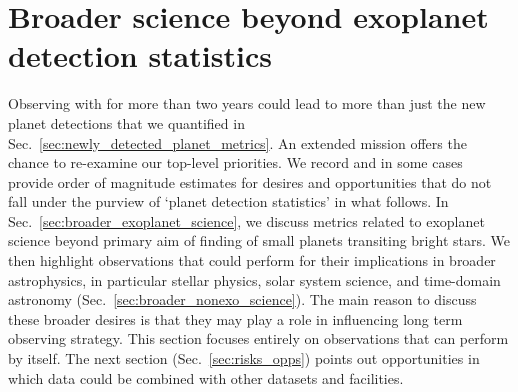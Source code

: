 \section{Broader science beyond exoplanet detection statistics}
\label{sec:broader_science_beyond_planet_detection_stats}


Observing with \tess for more than two years could lead to more than just the new planet detections that we quantified in Sec.~\ref{sec:newly_detected_planet_metrics}.
An extended mission offers the chance to re-examine our top-level priorities. %
We record and in some cases provide order of magnitude estimates for desires and opportunities that do not fall under the purview of `planet detection statistics' in what follows.
In Sec.~\ref{sec:broader_exoplanet_science}, we discuss metrics related to exoplanet science beyond \tesss primary aim of finding of small planets transiting bright stars.
We then highlight observations that \tess could perform for their implications in broader astrophysics, in particular stellar physics, solar system science, and time-domain astronomy (Sec.~\ref{sec:broader_nonexo_science}).
The main reason to discuss these broader desires is that they may play a role in influencing \tesss long term observing strategy.
This section focuses entirely on observations that \tess can perform by itself.
The next section (Sec.~\ref{sec:risks_opps}) points out opportunities in which \tess data could be combined with other datasets and facilities.





